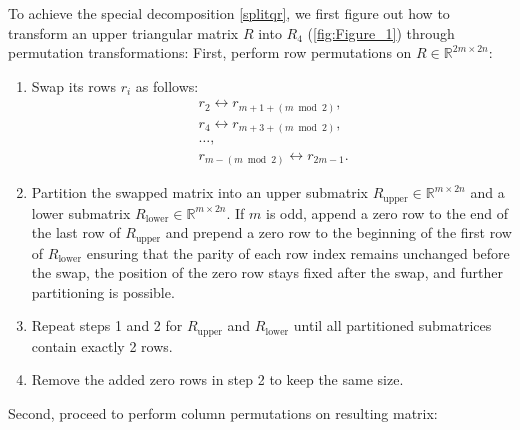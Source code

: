 \documentclass[conference]{IEEEtran}
\numberwithin{equation}{section}
\begin{document}
To achieve the special decomposition \eqref{splitqr}, we first figure out how to transform an upper triangular matrix $R$ into $R_4$ (\cref{fig:Figure_1}) through permutation transformations:
\newline
\newline
First, perform row permutations on $R\in \mathbb{R}^{2m \times 2n}$:
\begin{enumerate}
\item Swap its rows $r_i$ as follows:  
   \begin{equation} \label{eq:rowswap}
    \begin{aligned}
        &r_2 \leftrightarrow r_{m + 1 + (m \bmod 2)}, \quad \\
        &r_4 \leftrightarrow r_{m + 3 + (m \bmod 2)}, \quad \\
        &\dots, \quad \\
        &r_{m - (m \bmod 2)} \leftrightarrow r_{2m - 1}.
    \end{aligned}
   \end{equation}
\item  Partition the swapped matrix into an upper submatrix \( R_{\text{upper}} \in \mathbb{R}^{m \times 2n} \) and a lower submatrix \( R_{\text{lower}} \in \mathbb{R}^{m \times 2n} \). If \( m \) is odd, append a zero row to the end of the last row of \( R_{\text{upper}} \) and prepend a zero row to the beginning of the first row of \( R_{\text{lower}} \) ensuring that the parity of each row index remains unchanged before the swap, the position of the zero row stays fixed after the swap, and further partitioning is possible.
 
\item Repeat steps 1 and 2 for \( R_{\text{upper}} \) and \( R_{\text{lower}} \) until all  partitioned submatrices contain exactly 2 rows.  
 
\item  Remove the added zero rows in step 2 to keep the same size.
\end{enumerate}
Second, proceed to perform column permutations on resulting matrix:
\end{document}

